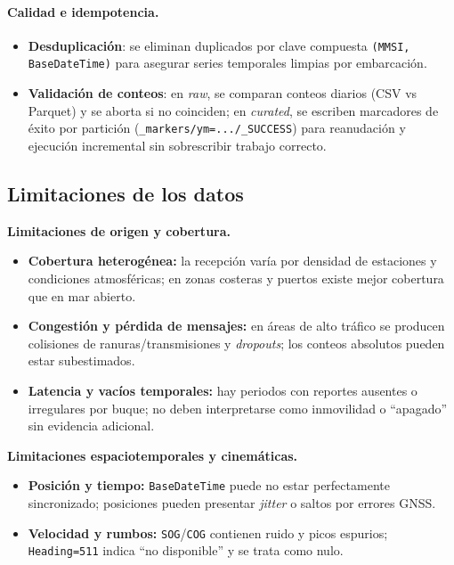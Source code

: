\documentclass[10pt]{article}
\begin{document}
\paragraph{Calidad e idempotencia.}
\begin{itemize}
  \item \textbf{Desduplicación}: se eliminan duplicados por clave compuesta \texttt{(MMSI, BaseDateTime)} para asegurar series temporales limpias por embarcación.
  \item \textbf{Validación de conteos}: en \textit{raw}, se comparan conteos diarios (CSV vs Parquet) y se aborta si no coinciden; en \textit{curated}, se escriben marcadores de éxito por partición (\texttt{\_markers/ym=.../\_SUCCESS}) para reanudación y ejecución incremental sin sobrescribir trabajo correcto.
\end{itemize}
\subsection{Limitaciones de los datos}
\label{sec:limitaciones-datos}

\vspace{0.2cm}
\noindent\textbf{Limitaciones de origen y cobertura.}
\begin{itemize}
  \item \textbf{Cobertura heterogénea:} la recepción varía por densidad de estaciones y condiciones atmosféricas; en zonas costeras y puertos existe mejor cobertura que en mar abierto.
  \item \textbf{Congestión y pérdida de mensajes:} en áreas de alto tráfico se producen colisiones de ranuras/transmisiones y \emph{dropouts}; los conteos absolutos pueden estar subestimados.
  \item \textbf{Latencia y vacíos temporales:} hay periodos con reportes ausentes o irregulares por buque; no deben interpretarse como inmovilidad o “apagado” sin evidencia adicional.
\end{itemize}

\vspace{0.1cm}
\noindent\textbf{Limitaciones espaciotemporales y cinemáticas.}
\begin{itemize}
  \item \textbf{Posición y tiempo:} \texttt{BaseDateTime} puede no estar perfectamente sincronizado; posiciones pueden presentar \emph{jitter} o saltos por errores GNSS.
  \item \textbf{Velocidad y rumbos:} \texttt{SOG}/\texttt{COG} contienen ruido y picos espurios; \texttt{Heading=511} indica “no disponible” y se trata como nulo.
\end{itemize}
\end{document}
